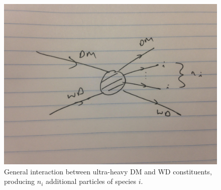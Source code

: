 \documentclass[twocolumn,showpacs,preprintnumbers,amsmath,amssymb,prl]{revtex4}
\begin{document}
\begin{figure}
\label{fig:feynmandiag}
\includegraphics[scale=.05]{feynmandiag}
\caption{General interaction between ultra-heavy DM and WD constituents, producing $n_i$ additional particles of species $i$.}
\end{figure}
\end{document}
